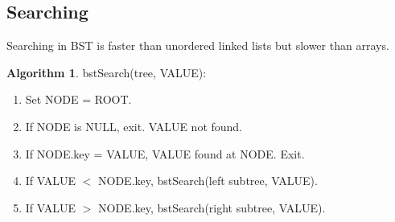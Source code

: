\documentclass[10pt, a4paper]{extarticle}
\theoremstyle{definition}
\newtheorem{alg}{Algorithm}
\begin{document}
\subsection{Searching}
Searching in BST is faster than unordered linked lists but slower than arrays.\\
\begin{alg}
	bstSearch(tree, VALUE):
	\begin{enumerate}
		\item Set NODE = ROOT.
		\item If NODE is NULL, exit. VALUE not found.
		\item If NODE.key = VALUE, VALUE found at NODE. Exit.
		\item If VALUE $<$ NODE.key, bstSearch(left subtree, VALUE).
		\item If VALUE $>$ NODE.key, bstSearch(right subtree, VALUE).
	\end{enumerate}
\end{alg}
\end{document}
